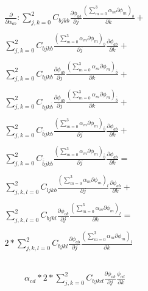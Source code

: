 \documentclass[a4paper,12pt]{article}
\begin{document}
\begin{equation}
    \begin{array}{c}
        \frac{\partial}{\partial \alpha_{ab}}:

        \sum_{j,k=0}^2 C_{bjkb}\frac{\partial\phi_{ab}}{\partial j}
    \frac{(\sum_{m=0}^3\alpha_m\partial\phi_m)_b}{\partial k}+ \\ \\

    \sum_{j,k=0}^2 C_{bjkb}\frac{(\sum_{m=0}^3\alpha_m\partial\phi_m)_b}{\partial j}
    \frac{\partial\phi_{ab}}{\partial k}+ \\ \\

    \sum_{j,k=0}^2 C_{bjk\overline{b}}\frac{\partial\phi_{ab}}{\partial j}
    \frac{(\sum_{m=0}^3\alpha_m\partial\phi_m)_{\overline{b}}}{\partial k}+ \\ \\

    \sum_{j,k=0}^2 C_{bjk\overline{\overline{b}}}\frac{\partial\phi_{ab}}{\partial j}
    \frac{(\sum_{m=0}^3\alpha_m\partial\phi_m)_{\overline{\overline{b}}}}{\partial k}+ \\ \\

    \sum_{j,k=0}^2 C_{\overline{b}jkb}\frac{(\sum_{m=0}^3\alpha_m\partial\phi_m)_{\overline{b}}}{\partial j}
    \frac{\partial\phi_{ab}}{\partial k}+ \\ \\

    \sum_{j,k=0}^2 C_{\overline{\overline{b}}jkb}\frac{(\sum_{m=0}^3\alpha_m\partial\phi_m)_{\overline{\overline{b}}}}{\partial j}
    \frac{\partial\phi_{ab}}{\partial k}= \\ \\

    \sum_{j,k,l=0}^2 C_{ljkb}\frac{(\sum_{m=0}^3\alpha_m\partial\phi_m)_l}{\partial j}
    \frac{\partial\phi_{ab}}{\partial k}+ \\ \\

    \sum_{j,k,l=0}^2 C_{bjkl}\frac{\partial\phi_{ab}}{\partial j}
    \frac{(\sum_{m=0}^3\alpha_m\partial\phi_m)_l}{\partial k}= \\ \\

    2*\sum_{j,k,l=0}^2 C_{bjkl}\frac{\partial\phi_{ab}}{\partial j}
    \frac{(\sum_{m=0}^3\alpha_m\partial\phi_m)_l}{\partial k} \\ \\
\end{array}
\end{equation} 

\begin{equation}
    \begin{array}{c}
        \alpha_{cd}*
    2*\sum_{j,k=0}^2 C_{bjkd}\frac{\partial\phi_{ab}}{\partial j}
    \frac{\phi_{cd}}{\partial k} \\ \\
\end{array}
\end{equation} 
\end{document}

